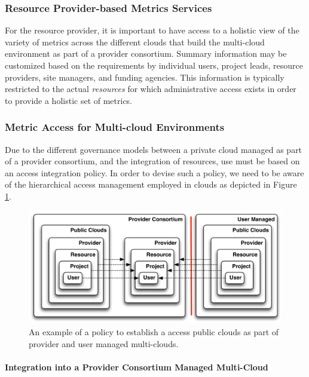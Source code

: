 \documentclass{tex/sig-alternate-2013}
\begin{document}
\subsubsection{Resource Provider-based Metrics Services} \label{S:resource-metric}

For the resource provider, it is important to have access to a holistic view of the variety of metrics across the different clouds that build the multi-cloud environment as part of a provider consortium.  Summary information may be customized based on the requirements by individual users, project leads, resource providers, site managers, and funding agencies. This information is typically restricted to the actual {\em resources} for which administrative access exists in order to provide a holistic set of metrics.

\subsubsection{Metric Access for Multi-cloud Environments} 

Due to the different governance models between a private cloud managed as part of a provider consortium, and the integration of resources, use must be based on an access integration policy. In order to devise such a policy, we need to be aware of the hierarchical access management employed in clouds as depicted in Figure \ref{F:metric-hierarchy}.

\begin{figure}[htb]
  \centering
    \includegraphics[width=1.0\columnwidth]{images/metric-hierarchy.pdf}
  \caption{An example of a policy to establish a access public clouds as part of 
    provider and user managed multi-clouds.}
  \label{F:metric-hierarchy}
\end{figure}


\paragraph{Integration into a Provider Consortium Managed Multi-Cloud}
\end{document}
